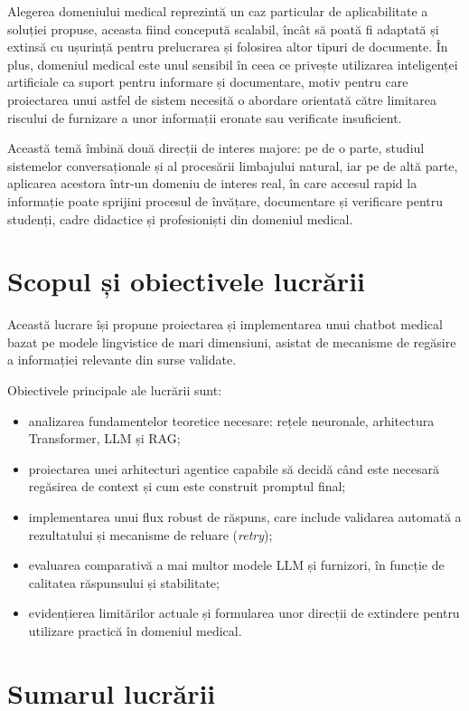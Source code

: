 \documentclass[12pt, a4paper, oneside, romanian]{teza-upb}
\begin{document}
Alegerea domeniului medical reprezintă un caz particular de aplicabilitate a soluției propuse, aceasta fiind concepută scalabil, încât să poată fi adaptată și extinsă cu ușurință pentru prelucrarea și folosirea altor tipuri de documente. În plus, domeniul medical este unul sensibil în ceea ce privește utilizarea inteligenței artificiale ca suport pentru informare și documentare, motiv pentru care proiectarea unui astfel de sistem necesită o abordare orientată către limitarea riscului de furnizare a unor informații eronate sau verificate insuficient.

Această temă îmbină două direcții de interes majore: pe de o parte, studiul sistemelor conversaționale și al procesării limbajului natural, iar pe de altă parte, aplicarea acestora într-un domeniu de interes real, în care accesul rapid la informație poate sprijini procesul de învățare, documentare și verificare pentru studenți, cadre didactice și profesioniști din domeniul medical.


\section{Scopul și obiectivele lucrării}

Această lucrare își propune proiectarea și implementarea unui chatbot medical bazat pe modele lingvistice de mari dimensiuni, asistat de mecanisme de regăsire a informației relevante din surse validate.

Obiectivele principale ale lucrării sunt:
\begin{itemize}
    \item analizarea fundamentelor teoretice necesare: rețele neuronale, arhitectura Transformer, LLM și RAG;
    \item proiectarea unei arhitecturi agentice capabile să decidă când este necesară regăsirea de context și cum este construit promptul final;
    \item implementarea unui flux robust de răspuns, care include validarea automată a rezultatului și mecanisme de reluare (\textit{retry});
    \item evaluarea comparativă a mai multor modele LLM și furnizori, în funcție de calitatea răspunsului și stabilitate;
    \item evidențierea limitărilor actuale și formularea unor direcții de extindere pentru utilizare practică în domeniul medical.
\end{itemize}

\section{Sumarul lucrării}
\end{document}
